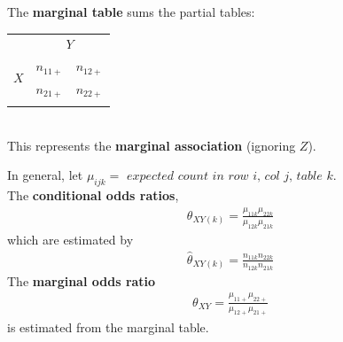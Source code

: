 \documentclass[11pt]{elegantbook}
\begin{document}
\begin{definition}
    The \textbf{marginal table} sums the partial tables:
\end{definition}
\begin{table}[htbp]
    \centering
    \begin{tabular}{rllll}
        \multicolumn{1}{c}{}                    & \multicolumn{4}{c}{$Y$}                                 \\ \cline{2-5} 
        \multicolumn{1}{r|}{\multirow{2}{*}{$X$}} & \multicolumn{2}{l|}{$n_{11+}$} & \multicolumn{2}{l|}{$n_{12+}$} \\ \cline{2-5} 
        \multicolumn{1}{r|}{}                   & \multicolumn{2}{l|}{$n_{21+}$} & \multicolumn{2}{l|}{$n_{22+}$} \\ \cline{2-5}
        \multicolumn{1}{l}{}                    &             &             &             &
    \end{tabular}\\
    This represents the \textbf{marginal association} (ignoring $Z$).
\end{table}
In general, let $\mu_{ijk}=\textit{ expected count in row i, col j, table k}$.\\
The \textbf{conditional odds ratios},
\begin{equation}
    \begin{aligned}
        \theta_{XY(k)}=\frac{\mu_{11k}\mu_{22k}}{\mu_{12k}\mu_{21k}}
    \end{aligned}
    \nonumber
\end{equation}
which are estimated by
\begin{equation}
    \begin{aligned}
        \hat{\theta}_{XY(k)}=\frac{n_{11k}n_{22k}}{n_{12k}n_{21k}}
    \end{aligned}
    \nonumber
\end{equation}
The \textbf{marginal odds ratio}
\begin{equation}
    \begin{aligned}
        \theta_{XY}=\frac{\mu_{11+}\mu_{22+}}{\mu_{12+}\mu_{21+}}
    \end{aligned}
    \nonumber
\end{equation}
is estimated from the marginal table.
\end{document}
